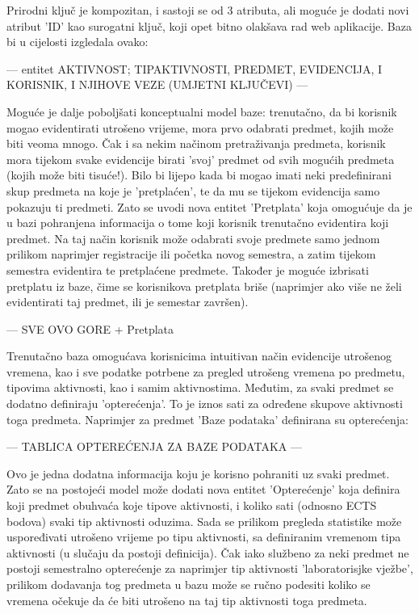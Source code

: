 \documentclass[times, utf8, zavrsni]{fer}
\begin{document}
Prirodni ključ je kompozitan, i sastoji se od 3 atributa, ali moguće je dodati novi atribut 'ID' kao surogatni ključ, koji opet bitno olakšava rad web aplikacije. Baza bi u cijelosti izgledala ovako:

--- entitet AKTIVNOST; TIPAKTIVNOSTI, PREDMET, EVIDENCIJA, I KORISNIK, I NJIHOVE VEZE (UMJETNI KLJUČEVI) ---

Moguće je dalje poboljšati konceptualni model baze: trenutačno, da bi korisnik mogao evidentirati utrošeno vrijeme, mora prvo odabrati predmet, kojih može biti veoma mnogo. Čak i sa nekim načinom pretraživanja predmeta, korisnik mora tijekom svake evidencije birati 'svoj' predmet od svih mogućih predmeta (kojih može biti tisuće!). Bilo bi lijepo kada bi mogao imati neki predefinirani skup predmeta na koje je 'pretplaćen', te da mu se tijekom evidencija samo pokazuju ti predmeti. Zato se uvodi nova entitet 'Pretplata' koja omogućuje da je u bazi pohranjena informacija o tome koji korisnik trenutačno evidentira koji predmet. Na taj način korisnik može odabrati svoje predmete samo jednom prilikom naprimjer registracije ili početka novog semestra, a zatim tijekom semestra evidentira te pretplaćene predmete. Također je moguće izbrisati pretplatu iz baze, čime se korisnikova pretplata briše (naprimjer ako više ne želi evidentirati taj predmet, ili je semestar završen).

--- SVE OVO GORE + Pretplata

Trenutačno baza omogućava korisnicima intuitivan način evidencije utrošenog vremena, kao i sve podatke potrbene za pregled utrošeng vremena po predmetu, tipovima aktivnosti, kao i samim aktivnostima. Međutim, za svaki predmet se dodatno definiraju 'opterećenja'. To je iznos sati za određene skupove aktivnosti toga predmeta. Naprimjer za predmet 'Baze podataka' definirana su opterećenja:

--- TABLICA OPTEREĆENJA ZA BAZE PODATAKA ---

Ovo je jedna dodatna informacija koju je korisno pohraniti uz svaki predmet. Zato se na postojeći model može dodati nova entitet 'Opterećenje' koja definira koji predmet obuhvaća koje tipove aktivnosti, i koliko sati (odnosno ECTS bodova) svaki tip aktivnosti oduzima. Sada se prilikom pregleda statistike može uspoređivati utrošeno vrijeme po tipu aktivnosti, sa definiranim vremenom tipa aktivnosti (u slučaju da postoji definicija). Čak iako službeno za neki predmet ne postoji semestralno opterećenje za naprimjer tip aktivnosti 'laboratorisjke vježbe', prilikom dodavanja tog predmeta u bazu može se ručno podesiti koliko se vremena očekuje da će biti utrošeno na taj tip aktivnosti toga predmeta.
\end{document}
